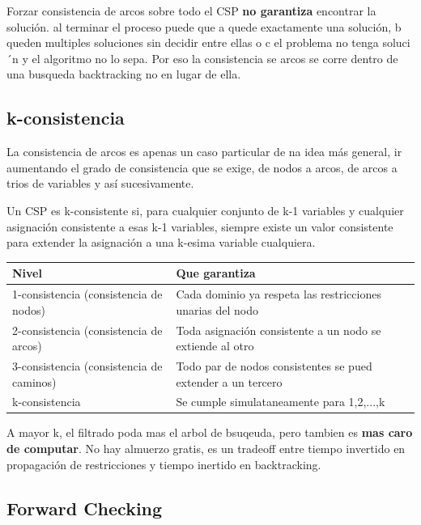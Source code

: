 Forzar consistencia de arcos sobre todo el CSP \textbf{no garantiza} encontrar la solución. al terminar el proceso puede que a quede exactamente una solución,
b queden multiples soluciones sin decidir entre ellas o c el problema no tenga soluci´n y el algoritmo no lo sepa. Por eso la consistencia se arcos se corre dentro de una
busqueda backtracking no en lugar de ella.

\subsection{k-consistencia}
La consistencia de arcos es apenas un caso particular de na idea más general, ir aumentando el grado de consistencia que se exige, de nodos a arcos, de arcos a trios de variables y así sucesivamente.

\begin{definition}
    Un CSP es k-consistente si, para cualquier conjunto de k-1 variables y cualquier asignación consistente a esas k-1 variables, siempre existe un valor consistente para extender la asignación a una k-esima variable cualquiera.
\end{definition}

\begin{table}[h!]
    \centering
    \begin{tabular}{|p{4.2cm}|p{8.5cm}|}
        \hline
        Nivel & Que garantiza \\ \hline
        1-consistencia (consistencia de nodos) & Cada dominio ya respeta las restricciones unarias del nodo \\ \hline
        2-consistencia (consistencia de arcos) & Toda asignación consistente a un nodo se extiende al otro \\ \hline
        3-consistencia (consistencia de caminos) & Todo par de nodos consistentes se pued extender a un tercero \\ \hline
        k-consistencia & Se cumple simulataneamente para 1,2,...,k \\ \hline
    \end{tabular}
\end{table}

A mayor k, el filtrado poda mas el arbol de bsuqeuda, pero tambien es \textbf{mas caro de computar}. No hay almuerzo gratis,
es un tradeoff entre tiempo invertido en propagación de restricciones y tiempo inertido en backtracking.

\subsection{Forward Checking}

